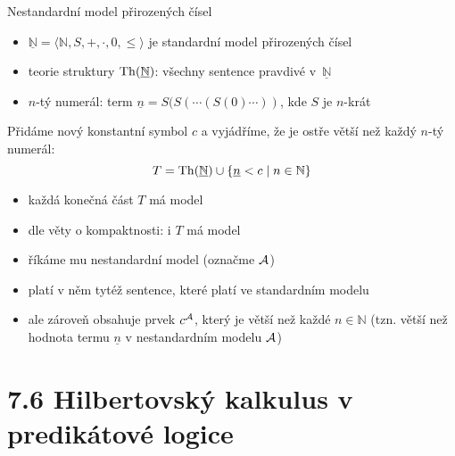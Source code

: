 \documentclass{beamer}
\begin{document}
\begin{frame}{Nestandardní model přirozených čísel}

    \begin{itemize}
        \item $\underline{\mathbb N}=\langle\mathbb N,S,+,\cdot,0,\leq\rangle$ je \alert{standardní model} přirozených čísel
        \item \alert{teorie struktury $\operatorname{Th}(\underline{\mathbb N})$:} všechny sentence \alert{pravdivé} v~$\underline{\mathbb N}$
        \item \alert{$n$-tý numerál:} term $\underline n=S(S(\cdots (S(0)\cdots))$, kde $S$ je $n$-krát
    \end{itemize}
    
    Přidáme nový konstantní symbol $c$ a vyjádříme, že je ostře větší než každý $n$-tý numerál:
    $$
    T=\operatorname{Th}(\underline{\mathbb N})\cup\{\underline n<c\mid n\in \mathbb N\}
    $$
        
    \begin{itemize}
        \item každá konečná část $T$ má model
        \item dle věty o kompaktnosti: i $T$ má model
        \item říkáme mu \alert{nestandardní model} (označme $\mathcal{A}$)
        \item platí v něm tytéž sentence, které platí ve standardním modelu
        \item ale zároveň obsahuje prvek $c^{\mathcal{A}}$, který je větší než každé $n\in \mathbb N$ (tzn. větší než hodnota termu $\underline n$ v nestandardním modelu $\mathcal{A}$)
    \end{itemize}    

\end{frame}


\section{7.6 Hilbertovský kalkulus v predikátové logice}
\end{document}

